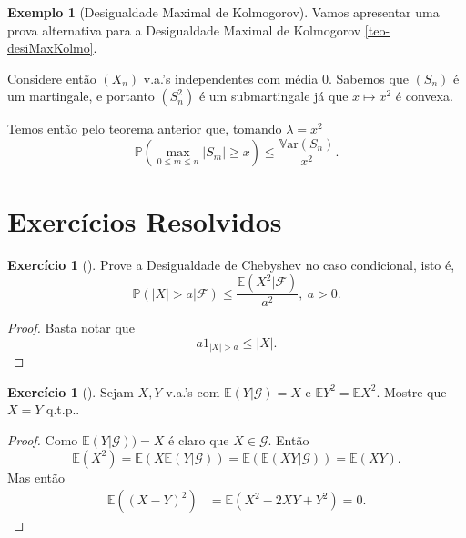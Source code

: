 \documentclass[12pt,a4paper,oneside]{book}
\theoremstyle{definition}
\newtheorem{example}[theorem]{Exemplo}
\newtheorem{xca}[theorem]{Exerc\'icio}
\theoremstyle{remark}
\numberwithin{equation}{section}
\newcommand{\E}{\mathbb{E}}
\newcommand{\pr}{\mathbb{P}}
\newcommand{\Var}{\mathbb{V}\text{ar}}
\begin{document}
\begin{tcolorbox}

\begin{example}[Desigualdade Maximal de Kolmogorov]\label{teo-desi-maxikolm-martin} Vamos apresentar uma prova alternativa para a Desigualdade Maximal de Kolmogorov \ref{teo-desiMaxKolmo}.
\bigskip

Considere então $(X_n)$ v.a.'s independentes com média 0. Sabemos que $(S_n)$ é um martingale, e portanto $(S_n^2)$ é um submartingale já que $x\mapsto x^2$ é convexa.

Temos então pelo teorema anterior que, tomando $\lambda= x^2$
$$\pr\left(\max_{0\leq m\leq n} |S_m|\geq x \right) \leq \dfrac{\Var(S_n)}{x^2}. $$
\end{example}

\end{tcolorbox}









\newpage
\section{Exercícios Resolvidos}
\begin{xca}[\cite{durrett}] Prove a Desigualdade de Chebyshev no caso condicional, isto é,
$$\pr(|X|>a|\mathcal{F})\leq \dfrac{\E(X^2|\mathcal{F})}{a^2},\ a>0. $$
\end{xca}

\begin{proof}
Basta notar que
$$a 1_{|X|> a}\leq |X|. $$
\end{proof}

\begin{xca}[\cite{durrett}]
Sejam $X,Y$ v.a.'s  com $\E(Y|\mathcal{G}) = X$ e $\E Y^2 = \E X^2$. Mostre que $X=Y$ q.t.p..
\end{xca}
\begin{proof}
Como $\E(Y|\mathcal{G}))=X$ é claro que $X\in \mathcal{G}$. Então
$$\E(X^2) = \E(X\E(Y|\mathcal{G})) = \E(\E(XY|\mathcal{G})) = \E(XY).$$
Mas então
\begin{align*}
\E((X-Y)^2) & = \E(X^2 -2XY + Y^2) = 0.
\end{align*}
\end{proof}
\end{document}
